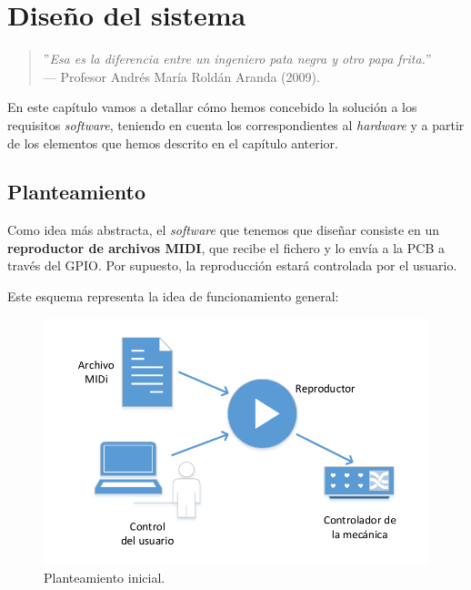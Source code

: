\chapter{Diseño del sistema}
\label{cap: capitulo_4}

\begin{quote}
	\small \flushright ''\textit{Esa es la diferencia entre un ingeniero pata negra y otro papa frita.}'' \\
	--- Profesor Andrés María Roldán Aranda (2009).
\end{quote}

\vspace{8em}

En este capítulo vamos a detallar cómo hemos concebido la solución a los requisitos \textit{software}, teniendo en cuenta los correspondientes al \textit{hardware} y a partir de los elementos que hemos descrito en el capítulo anterior.

\newpage

\section{Planteamiento}

Como idea más abstracta, el \textit{software} que tenemos que diseñar consiste en un \textbf{reproductor de archivos \acrshort{MIDI}}, que recibe el fichero y lo envía a la \acrshort{PCB} a través del \acrshort{GPIO}. Por supuesto, la reproducción estará controlada por el usuario.

Este esquema representa la idea de funcionamiento general:

\smallskip

\begin{figure}[H]
	\noindent \begin{centering}
		\includegraphics[width=\linewidth*3/4]{capitulo4/idea}
		\par\end{centering}
	\smallskip
	\caption{\label{fig:idea} Planteamiento inicial.}
\end{figure} 


